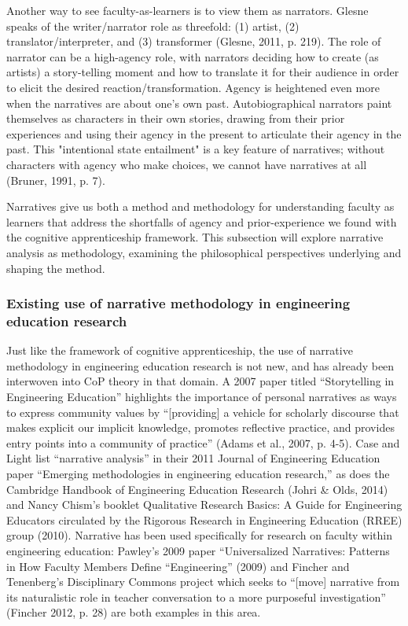 Another way to see faculty-as-learners is to view them as narrators. Glesne speaks of the writer/narrator role as threefold: (1) artist, (2) translator/interpreter, and (3) transformer (Glesne, 2011, p. 219). The role of narrator can be a high-agency role, with narrators deciding how to create (as artists) a story-telling moment and how to translate it for their audience in order to elicit the desired reaction/transformation. Agency is heightened even more when the narratives are about one's own past. Autobiographical narrators paint themselves as characters in their own stories, drawing from their prior experiences and using their agency in the present to articulate their agency in the past. This "intentional state entailment" is a key feature of narratives; without characters with agency who make choices, we cannot have narratives at all (Bruner, 1991, p. 7).

Narratives give us both a method and methodology for understanding faculty as learners that address the shortfalls of agency and prior-experience we found with the cognitive apprenticeship framework. This subsection will explore narrative analysis as methodology, examining the philosophical perspectives underlying and shaping the method.

\subsubsection{Existing use of narrative methodology in engineering education research}

Just like the framework of cognitive apprenticeship, the use of narrative methodology in engineering education research is not new, and has already been interwoven into CoP theory in that domain. A 2007 paper titled “Storytelling in Engineering Education” highlights the importance of personal narratives as ways to express community values by “[providing] a vehicle for scholarly discourse that makes explicit our implicit knowledge, promotes reflective practice, and provides entry points into a community of practice” (Adams et al., 2007, p. 4-5). Case and Light list “narrative analysis” in their 2011 Journal of Engineering Education paper “Emerging methodologies in engineering education research,” as does the Cambridge Handbook of Engineering Education Research (Johri & Olds, 2014) and Nancy Chism’s booklet Qualitative Research Basics: A Guide for Engineering Educators circulated by the Rigorous Research in Engineering Education (RREE) group (2010). Narrative has been used specifically for research on faculty within engineering education: Pawley’s 2009 paper “Universalized Narratives: Patterns in How Faculty Members Define “Engineering” (2009) and Fincher and Tenenberg’s Disciplinary Commons project which seeks to “[move] narrative from its naturalistic role in teacher conversation to a more purposeful investigation” (Fincher 2012, p. 28) are both examples in this area.

